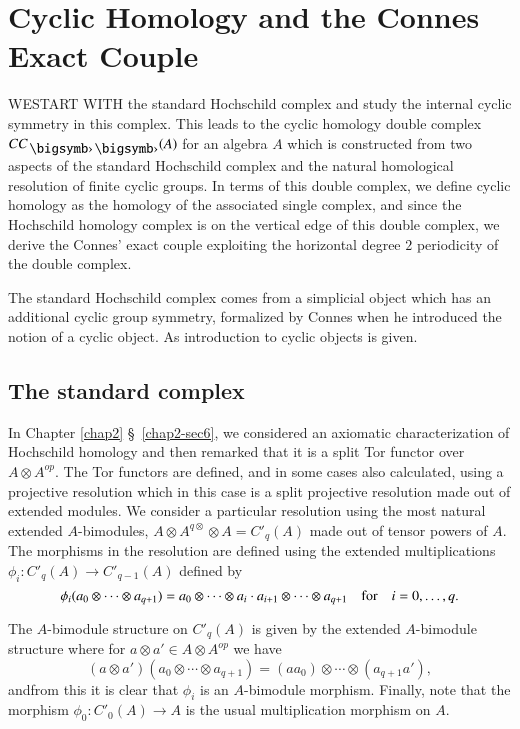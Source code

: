 \chapter{Cyclic Homology and the Connes Exact Couple}\label{chap3}

WE\pageoriginale START WITH the standard Hochschild complex and study
the internal cyclic symmetry in this complex. This leads to the cyclic
homology double complex $CC_{\bigdot\bigdot}(A)$ for an algebra $A$
which is constructed from two aspects of the standard Hochschild
complex and the natural homological resolution of finite cyclic
groups. In terms of this double complex, we define cyclic homology as
the homology of the associated single complex, and since the
Hochschild homology complex is on the vertical edge of this double
complex, we derive the Connes' exact couple exploiting the horizontal
degree $2$ periodicity of the double complex.

The standard Hochschild complex comes from a simplicial object which
has an additional cyclic group symmetry, formalized by Connes when he
introduced the notion of a cyclic object. As introduction to cyclic
objects is given.

\section{The standard complex}\label{chap3-sec1}

In Chapter \ref{chap2} \S\ \ref{chap2-sec6}, we considered an
axiomatic characterization of Hochs\-child homology and then remarked
that it is a split Tor functor over $A\otimes A^{op}$. The Tor
functors are defined, and in some cases also calculated, using a
projective resolution which in this case is a split projective
resolution made out of extended modules. We consider a particular
resolution using the most natural extended $A$-bimodules, $A\otimes
A^{q\otimes}\otimes A=C'_{q}(A)$ made out of tensor powers of $A$. The
morphisms in the resolution are defined using the extended
multiplications $\phi_{i}:C'_{q}(A)\to C'_{q-1}(A)$ defined by
$$
\phi_{i}(a_{0}\otimes\cdots\otimes a_{q+1})=a_{0}\otimes \cdots\otimes
a_{i}\cdot a_{i+1}\otimes \cdots\otimes a_{q+1}\quad\text{for}\quad
i=0,\ldots,q. 
$$

The $A$-bimodule structure on $C'_{q}(A)$ is given by the extended
$A$-bimodule structure where for $a\otimes a'\in A\otimes A^{op}$ we
have
$$
(a\otimes a')(a_{0}\otimes\cdots\otimes a_{q+1})=(aa_{0})\otimes
\cdots\otimes (a_{q+1}a'),
$$
and\pageoriginale from this it is clear that $\phi_{i}$ is an
$A$-bimodule morphism. Finally, note that the morphism
$\phi_{0}:C'_{0}(A)\to A$ is the usual multiplication morphism on $A$.

